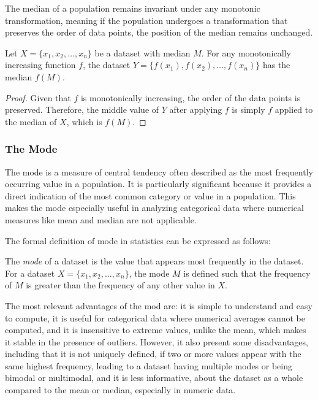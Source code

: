 The median of a population remains invariant under any monotonic transformation, meaning if the population undergoes a transformation that preserves the order of data points, the position of the median remains unchanged.

\begin{proposition}
Let \( X = \{x_1, x_2, \dots, x_n\} \) be a dataset with median \( M \). For any monotonically increasing function \( f \), the dataset \( Y = \{f(x_1), f(x_2), \dots, f(x_n)\} \) has the median \( f(M) \).
\end{proposition}
\begin{proof}
Given that \( f \) is monotonically increasing, the order of the data points is preserved. Therefore, the middle value of \( Y \) after applying \( f \) is simply \( f \) applied to the median of \( X \), which is \( f(M) \).
\end{proof}


\subsubsection*{The Mode}
\label{sec:mode}

The mode is a measure of central tendency often described as the most frequently occurring value in a population. It is particularly significant because it provides a direct indication of the most common category or value in a population. This makes the mode especially useful in analyzing categorical data where numerical measures like mean and median are not applicable.

The formal definition of mode in statistics can be expressed as follows:

\begin{definition}
The \emph{mode} of a dataset is the value that appears most frequently in the dataset. For a dataset \( X = \{x_1, x_2, \dots, x_n\} \), the mode \( M \) is defined such that the frequency of \( M \) is greater than the frequency of any other value in \( X \).
\end{definition}

The most relevant advantages of the mod are: it is simple to understand and easy to compute, it is useful for categorical data where numerical averages cannot be computed, and it is insensitive to extreme values, unlike the mean, which makes it stable in the presence of outliers. However, it also present some disadvantages, including that it is not uniquely defined, if two or more values appear with the same highest frequency, leading to a dataset having multiple modes or being bimodal or multimodal, and it is less informative, about the dataset as a whole compared to the mean or median, especially in numeric data.

